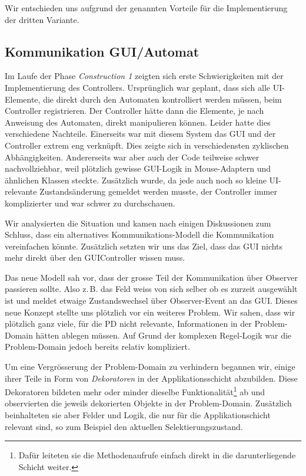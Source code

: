 \documentclass[12pt,halfparskip]{scrartcl}
\begin{document}
Wir entschieden uns aufgrund der genannten Vorteile für die Implementierung der dritten Variante.

\subsection{Kommunikation GUI/Automat}

Im Laufe der Phase \emph{Construction 1} zeigten sich erste Schwierigkeiten mit der Implementierung des Controllers. Ursprünglich war geplant, dass sich alle UI-Elemente, die direkt durch den Automaten kontrolliert werden müssen, beim Controller registrieren. Der Controller hätte dann die Elemente, je nach Anweisung des Automaten, direkt manipulieren können. Leider hatte dies verschiedene Nachteile. Einerseits war mit diesem System das GUI und der Controller extrem eng verknüpft. Dies zeigte sich in verschiedensten zyklischen Abhängigkeiten. Andererseits war aber auch der Code teilweise schwer nachvollziehbar, weil plötzlich gewisse GUI-Logik in Mouse-Adaptern und ähnlichen Klassen steckte. Zusätzlich wurde, da jede auch noch so kleine UI-relevante Zustandsänderung gemeldet werden musste, der Controller immer komplizierter und war schwer zu durchschauen.

Wir analysierten die Situation und kamen nach einigen Diskussionen zum Schluss, dass ein alternatives Kommunikations-Modell die Kommunikation vereinfachen könnte. Zusätzlich setzten wir uns das Ziel, dass das GUI nichts mehr direkt über den GUIController wissen muss. 

Das neue Modell sah vor, dass der grosse Teil der Kommunikation über Observer passieren sollte. Also z.\,B. das Feld weiss von sich selber ob es zurzeit ausgewählt ist und meldet etwaige Zustandswechsel über Observer-Event an das GUI. Dieses neue Konzept stellte uns plötzlich vor ein weiteres Problem. Wir sahen, dass wir plötzlich ganz viele, für die PD nicht relevante, Informationen in der Problem-Domain hätten ablegen müssen. Auf Grund der komplexen Regel-Logik war die Problem-Domain jedoch bereits relativ kompliziert. 

Um eine Vergrösserung der Problem-Domain zu verhindern begannen wir, einige ihrer Teile in Form von \emph{Dekoratoren} in der Applikationsschicht abzubilden. Diese Dekoratoren bildeten mehr oder minder dieselbe Funktionalität\footnote{Dafür leiteten sie die Methodenaufrufe einfach direkt in die darunterliegende Schicht weiter.} ab und observierten die jeweils dekorierten Objekte in der Problem-Domain. Zusätzlich beinhalteten sie aber Felder und Logik, die nur für die Applikationschicht relevant sind, so zum Beispiel den aktuellen Selektierungszustand.
\end{document}
